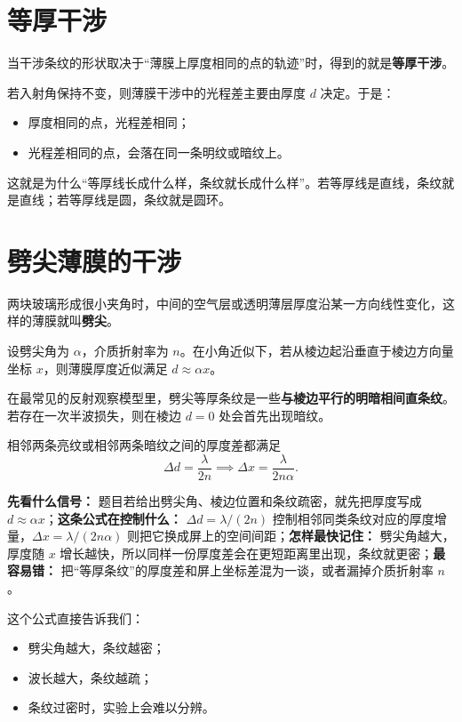 \documentclass[lang=cn,11pt]{elegantbook}
\begin{document}
\section{等厚干涉}

当干涉条纹的形状取决于“薄膜上厚度相同的点的轨迹”时，得到的就是\textbf{等厚干涉}。

若入射角保持不变，则薄膜干涉中的光程差主要由厚度 \(d\) 决定。于是：
\begin{itemize}
  \item 厚度相同的点，光程差相同；
  \item 光程差相同的点，会落在同一条明纹或暗纹上。
\end{itemize}

这就是为什么“等厚线长成什么样，条纹就长成什么样”。若等厚线是直线，条纹就是直线；若等厚线是圆，条纹就是圆环。

\section{劈尖薄膜的干涉}

两块玻璃形成很小夹角时，中间的空气层或透明薄层厚度沿某一方向线性变化，这样的薄膜就叫\textbf{劈尖}。

设劈尖角为 \(\alpha\)，介质折射率为 \(n\)。在小角近似下，若从棱边起沿垂直于棱边方向量坐标 \(x\)，则薄膜厚度近似满足 \(d\approx \alpha x\)。

在最常见的反射观察模型里，劈尖等厚条纹是一些\textbf{与棱边平行的明暗相间直条纹}。若存在一次半波损失，则在棱边 \(d=0\) 处会首先出现暗纹。

相邻两条亮纹或相邻两条暗纹之间的厚度差都满足
\[
\Delta d=\frac{\lambda}{2n}
\implies
\Delta x=\frac{\lambda}{2n\alpha}.
\]

\begin{note}
\textbf{先看什么信号：} 题目若给出劈尖角、棱边位置和条纹疏密，就先把厚度写成 \(d\approx \alpha x\)；\textbf{这条公式在控制什么：} \(\Delta d=\lambda/(2n)\) 控制相邻同类条纹对应的厚度增量，\(\Delta x=\lambda/(2n\alpha)\) 则把它换成屏上的空间间距；\textbf{怎样最快记住：} 劈尖角越大，厚度随 \(x\) 增长越快，所以同样一份厚度差会在更短距离里出现，条纹就更密；\textbf{最容易错：} 把“等厚条纹”的厚度差和屏上坐标差混为一谈，或者漏掉介质折射率 \(n\)。
\end{note}

\begin{remark}
这个公式直接告诉我们：
\begin{itemize}
  \item 劈尖角越大，条纹越密；
  \item 波长越大，条纹越疏；
  \item 条纹过密时，实验上会难以分辨。
\end{itemize}
\end{remark}
\end{document}
